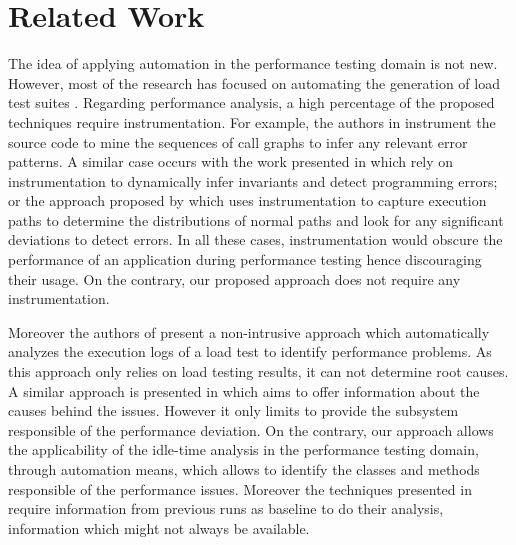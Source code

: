 \documentclass[runningheads,a4paper]{llncs}
\begin{document}
\section{Related Work}
\label{RelatedWork}
\vspace{-5pt}
The idea of applying automation in the performance testing domain is not new.
However, most of the research has focused on automating the generation of load
test suites
\cite{Chen1,Elvira1,Zhang1,Briand1,Bayan1,Avritzer2,Avritzer3,Garousi1}.
Regarding performance analysis, a high percentage of the proposed
techniques require instrumentation. For example, the authors in \cite{Yang1}
instrument the source code to mine the sequences of call graphs to infer any
relevant error patterns. A similar case occurs with the work presented in
\cite{Hangal1,Csallner1} which rely on instrumentation to dynamically infer
invariants and detect programming errors; or the approach proposed by
\cite{Chen2} which uses instrumentation to capture execution paths to determine
the distributions of normal paths and look for any significant deviations to
detect errors. In all these cases, instrumentation would obscure the performance
of an application during performance testing hence discouraging their usage.
On the contrary, our proposed approach does not require any instrumentation.

Moreover the authors of \cite{Jiang2009} present a non-intrusive approach which
automatically analyzes the execution logs of a load test to identify performance
problems. As this approach only relies on load testing results, it can not
determine root causes. A similar approach is presented in \cite{Malik1} which
aims to offer information about the causes behind the issues. However it only limits to provide the subsystem responsible of the performance deviation. On the contrary, our approach
allows the applicability of the idle-time analysis in the performance testing
domain, through automation means, which allows to identify the classes and
methods responsible of the performance issues. Moreover the techniques presented
in \cite{Jiang2009,Malik1} require information from previous runs as
baseline to do their analysis, information which might not always be available.

\vspace{-5pt}
\end{document}
